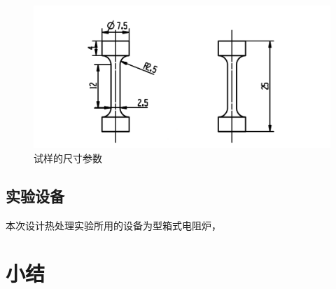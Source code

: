 \begin{figure}[h!]
	\centering
	\includegraphics[width=0.99\linewidth]{pic/试样}
	\caption{试样的尺寸参数}
	\label{fig:试样尺寸}
\end{figure}

%

\subsection{实验设备}
本次设计热处理实验所用的设备为型箱式电阻炉，



\section{小结}
